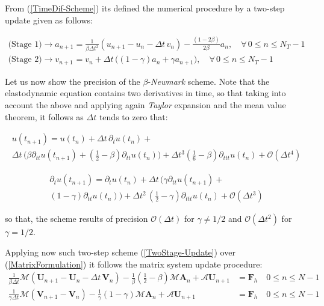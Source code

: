 From (\ref{TimeDif-Scheme}) its defined the numerical procedure by a two-step update given as follows:

\begin{align}
    \label{TwoStage-Update}
    \text{(Stage 1)}\longrightarrow  a_{n+1} &= \frac{1}{\beta \Delta t^2} ( u_{n+1}-u_n - \Delta t \, v_n) - \frac{(1-2\beta)}{2 \beta} a_n, \quad \forall \, 0 \leq n \leq N_T-1 \\
    \text{(Stage 2)}\longrightarrow v_{n+1} &= v_n + \Delta t \, \big( (1-\gamma) a_n + \gamma a_{n+1} \big), \quad \forall \, 0 \leq n \leq N_T-1
\end{align}

Let us now show the precision of the $\beta$-\textit{Newmark} scheme. Note that the elastodynamic equation contains two derivatives in time, so that taking into account the above and applying again \textit{Taylor} expansion and the mean value theorem, it follows as $\Delta t$ tends to zero that:

\begin{multline}
    u(t_{n+1}) = u(t_{n}) + \Delta t \, \partial_{t} u(t_n) + \\
    \Delta t \, \big( \beta \partial_{tt} u(t_{n+1}) + (\frac{1}{2}- \beta) \partial_{tt} u(t_n) \big) + \Delta t^3 (\frac{1}{6}-\beta) \partial_{ttt}u(t_n) + \mathcal{O}(\Delta t^4)
\end{multline}

\begin{multline}
    \partial_{t} u(t_{n+1}) = \partial_{t} u(t_n) + \Delta t\, \big( \gamma \partial_{tt} u(t_{n+1}) + \\
    (1-\gamma) \partial_{tt}u(t_n) \big) + \Delta t^2 \, (\frac{1}{2}-\gamma) \partial_{ttt} u(t_n) + \mathcal{O}(\Delta t^3)
\end{multline}

so that, the scheme results of precision $\mathcal{O}(\Delta t)$ for $\gamma \neq 1/2$ and $\mathcal{O}(\Delta t^2)$ for $\gamma = 1/2$.

Applying now such two-step scheme (\ref{TwoStage-Update}) over (\ref{MatrixFormulation}) it follows the matrix system update procedure:
\begin{align}
    \label{MatrixSystemUpdate}
    \frac{1}{\beta \Delta t} \mathcal{M}(\mathbf{U}_{n+1} - \mathbf{U}_{n} - \Delta t\, \mathbf{V}_n) - \frac{1}{\beta}(\frac{1}{2}- \beta) \mathcal{M}\mathbf{A}_n + \mathcal{A}\mathbf{U}_{n+1} &= \mathbf{F}_h \quad 0 \leq n \leq N-1 \\
    \frac{1}{\gamma \Delta t} \mathcal{M}(\mathbf{V}_{n+1} - \mathbf{V}_{n}) - \frac{1}{\gamma}(1-\gamma) \mathcal{M}\mathbf{A}_n + \mathcal{A}\mathbf{U}_{n+1} & = \mathbf{F}_h \quad 0 \leq n \leq N-1
\end{align}

